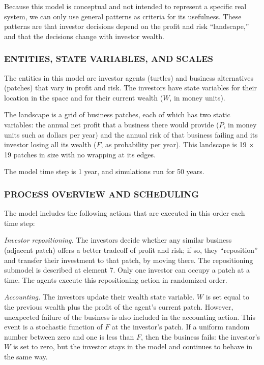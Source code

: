 \documentclass[]{article}
\begin{document}
Because this model is conceptual and not intended to represent a
specific real system, we can only use general patterns as criteria for
its usefulness. These patterns are that investor decisions depend on the
profit and risk ``landscape,'' and that the decisions change with
investor wealth.

\hypertarget{entities-state-variables-and-scales}{%
\subsubsection{ENTITIES, STATE VARIABLES, AND
SCALES}\label{entities-state-variables-and-scales}}

The entities in this model are investor agents (turtles) and business
alternatives (patches) that vary in profit and risk. The investors have
state variables for their location in the space and for their current
wealth ($W$, in money units).

The landscape is a grid of business patches, each of which has two
static variables: the annual net profit that a business there would
provide (\(P\), in money units such as dollars per year) and the
annual risk of that business failing and its investor losing all its
wealth (\(F\), as probability per year). This landscape is 19 × 19
patches in size with no wrapping at its edges.

The model time step is 1 year, and simulations run for 50 years.

\hypertarget{process-overview-and-scheduling}{%
\subsubsection{PROCESS OVERVIEW AND
SCHEDULING}\label{process-overview-and-scheduling}}

The model includes the following actions that are executed in this order
each time step:

\emph{Investor repositioning.} The investors decide whether any similar
business (adjacent patch) offers a better tradeoff of profit and risk;
if so, they ``reposition'' and transfer their investment to that patch,
by moving there. The repositioning submodel is described at element 7.
Only one investor can occupy a patch at a time. The agents execute this
repositioning action in randomized order.

\emph{Accounting.} The investors update their wealth state variable.
\(W\) is set equal to the previous wealth plus the profit of the
agent's current patch. However, unexpected failure of the business is
also included in the accounting action. This event is a stochastic
function of \(F\) at the investor's patch. If a uniform random number
between zero and one is less than \(F\), then the business fails: the
investor's \(W\) is set to zero, but the investor stays in the model
and continues to behave in the same way.
\end{document}
